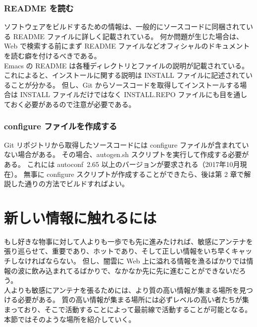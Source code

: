 \subsubsection{README を読む}
ソフトウェアをビルドするための情報は、一般的にソースコードに同梱されている README ファイルに詳しく記載されている。
何か問題が生じた場合は、Web で検索する前にまず README ファイルなどオフィシャルのドキュメントを読む癖を付けるべきである。\\

Emacs の README は各種ディレクトリとファイルの説明が記載されている。
これによると、インストールに関する説明は INSTALL ファイルに記述されていることが分かる。
但し、Git からソースコードを取得してインストールする場合は INSTALL ファイルだけではなく INSTALL.REPO ファイルにも目を通しておく必要があるので注意が必要である。
\subsubsection{configure ファイルを作成する}
Git リポジトリから取得したソースコードには configure ファイルが含まれていない場合がある。
その場合、autogen.sh スクリプトを実行して作成する必要がある。
これには autoconf~2.65 以上のバージョンが要求される（2017年10月現在）。
無事に configure スクリプトが作成することができたら、後は第 2 章で解説した通りの方法でビルドすればよい。
\section{新しい情報に触れるには}
もし好きな物事に対して人よりも一歩でも先に進みたければ、敏感にアンテナを張り巡らせて、重要であり、ホットであり、そして正しい情報をいち早くキャッチしなければならない。
但し、闇雲に Web 上に溢れる情報を漁るばかりでは情報の波に飲み込まれてるばかりで、なかなか先に先に進むことができないだろう。\\

人よりも敏感にアンテナを張るためには、より質の高い情報が集まる場所を見つける必要がある。
質の高い情報が集まる場所には必ずレベルの高い者たちが集まっており、そこで活動することによって最前線で活動することが可能となる。
本節ではそのような場所を紹介していく。
